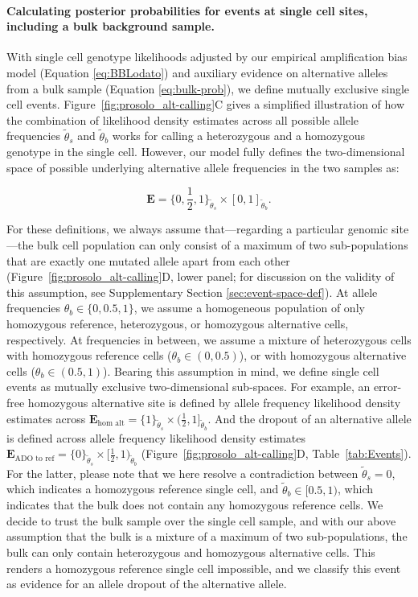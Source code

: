 \documentclass[12pt,inline]{wlscirep}
\begin{document}
\paragraph{Calculating posterior probabilities for events at single cell sites, including a bulk background sample.}
With single cell genotype likelihoods adjusted by our empirical amplification bias model (Equation \ref{eq:BBLodato}) and auxiliary evidence on alternative alleles from a bulk sample (Equation \ref{eq:bulk-prob}), we define mutually exclusive single cell events.
Figure~\ref{fig:prosolo_alt-calling}C gives a simplified illustration of how the combination of likelihood density estimates across all possible allele frequencies $\tilde{\theta}_s$ and $\tilde{\theta}_b$ works for calling a heterozygous and a homozygous genotype in the single cell.
However, our model fully defines the two-dimensional space of possible underlying alternative allele frequencies in the two samples as:

\begin{equation}
  \label{eq:event-space}
  \boldsymbol{E} =\{0, \frac{1}{2}, 1\}_{\tilde{\theta}_s} \times [0, 1]_{\tilde{\theta}_b}.
\end{equation}

For these definitions, we always assume that---regarding a particular genomic site---the bulk cell population can only consist of a maximum of two sub-populations that are exactly one mutated allele apart from each other (Figure~\ref{fig:prosolo_alt-calling}D, lower panel; for discussion on the validity of this assumption, see Supplementary Section \ref{sec:event-space-def}).
At allele frequencies $\theta_b \in \{0, 0.5, 1\}$, we assume a homogeneous population of only homozygous reference, heterozygous, or homozygous alternative cells, respectively.
At frequencies in between, we assume a mixture of heterozygous cells with homozygous reference cells ($\theta_b \in (0,0.5)$), or with homozygous alternative cells ($\theta_b \in (0.5,1)$).
Bearing this assumption in mind, we define single cell events as mutually exclusive two-dimensional sub-spaces.
For example, an error-free homozygous alternative site is defined by allele frequency likelihood density estimates across $\boldsymbol{E}_{\text{hom alt}} = \{ 1 \}_{\tilde{\theta}_s} \times (\frac{1}{2}, 1]_{\tilde{\theta}_b}$.
And the dropout of an alternative allele is defined across allele frequency likelihood density estimates $\boldsymbol{E}_{\text{ADO to ref}} = \{ 0 \}_{\tilde{\theta}_s} \times [\frac{1}{2}, 1)_{\tilde{\theta}_b}$ (Figure~\ref{fig:prosolo_alt-calling}D, Table~\ref{tab:Events}).
For the latter, please note that we here resolve a contradiction between $\tilde{\theta}_s = 0$, which indicates a homozygous reference single cell, and $\tilde{\theta}_b \in [0.5,1)$, which indicates that the bulk does not contain any homozygous reference cells.
We decide to trust the bulk sample over the single cell sample, and with our above assumption that the bulk is a mixture of a maximum of two sub-populations, the bulk can only contain heterozygous and homozygous alternative cells.
This renders a homozygous reference single cell impossible, and we classify this event as evidence for an allele dropout of the alternative allele.
\end{document}
